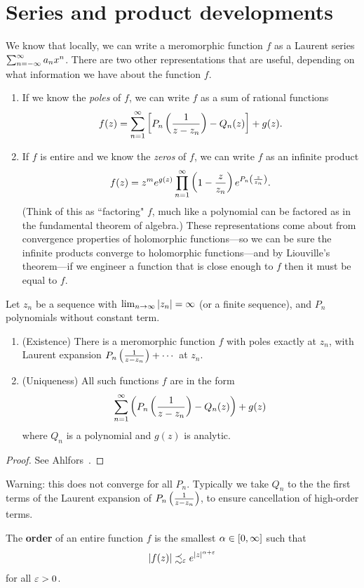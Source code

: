 \section{Series and product developments}
We know that locally, we can write a meromorphic function $f$ as a Laurent series $\sum_{n=-\infty}^{\infty} a_nx^n$. There are two other representations that are useful, depending on what information we have about the function $f$.
\begin{enumerate}
\item If we know the {\it poles} of $f$, we can write $f$ as a sum of rational functions
\[
f(z)=\sum_{n=1}^{\infty}\left[ { P_n\left( {\frac{1}{z-z_n}} \right) - Q_n(z)} \right]+g(z).
\]
\item If $f$ is entire and we know the {\it zeros} of $f$, we can write $f$ as an infinite product
\[
f(z)=z^me^{g(z)}\prod_{n=1}^{\infty}\left( {1-\frac{z}{z_n}} \right)e^{P_n\left( {\frac{z}{z_n}} \right)}.
\]
(Think of this as ``factoring" $f$, much like a polynomial can be factored as in the fundamental theorem of algebra.)
These representations come about from convergence properties of holomorphic functions---so we can be sure the infinite products converge to holomorphic functions---and by Liouville's theorem---if we engineer a function that is close enough to $f$ then it must be equal to $f$.
\end{enumerate}
\begin{thm}
Let $z_n$ be a sequence with $\lim_{n\to \infty} |z_n|=\infty$ (or a finite sequence), and $P_n$ polynomials without constant term.
\begin{enumerate}
\item (Existence)
There is a meromorphic function $f$ with poles exactly at $z_n$, with Laurent expansion $P_n\left( {\frac{1}{z-z_n}} \right)+\cdots $ at $z_n$.
\item (Uniqueness)
All such functions $f$ are in the form
\[
\sum_{n=1}^{\infty} \left( {P_n\left( {\frac{1}{z-z_n}} \right)-Q_n(z)} \right)+g(z)
\]
where $Q_n$ is a polynomial and $g(z)$ is analytic.
\end{enumerate}
\end{thm}
\begin{proof}
See Ahlfors~\cite[p. 187]{Ah79}.
\end{proof}
Warning: this does not converge for all $P_n$. Typically we take $Q_n$ to the the first terms of the Laurent expansion of $P_n\left( {\frac{1}{z-z_n}} \right)$, to ensure cancellation of high-order terms.
\begin{df}
The \textbf{order} of an entire function $f$ is the smallest $\alpha\in [0,\infty]$ such that
\[
|f(z)|\precsim_{\varepsilon} e^{|z|^{\alpha+\varepsilon}}
\]
for all $\varepsilon>0$. 
\end{df}
